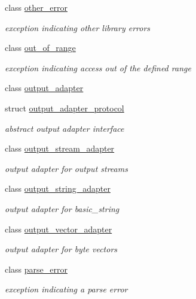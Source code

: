 \begin{DoxyCompactItemize}
class \hyperlink{classnlohmann_1_1detail_1_1other__error}{other\+\_\+error}
\begin{DoxyCompactList}\small\item\em exception indicating other library errors \end{DoxyCompactList}\item 
class \hyperlink{classnlohmann_1_1detail_1_1out__of__range}{out\+\_\+of\+\_\+range}
\begin{DoxyCompactList}\small\item\em exception indicating access out of the defined range \end{DoxyCompactList}\item 
class \hyperlink{classnlohmann_1_1detail_1_1output__adapter}{output\+\_\+adapter}
\item 
struct \hyperlink{structnlohmann_1_1detail_1_1output__adapter__protocol}{output\+\_\+adapter\+\_\+protocol}
\begin{DoxyCompactList}\small\item\em abstract output adapter interface \end{DoxyCompactList}\item 
class \hyperlink{classnlohmann_1_1detail_1_1output__stream__adapter}{output\+\_\+stream\+\_\+adapter}
\begin{DoxyCompactList}\small\item\em output adapter for output streams \end{DoxyCompactList}\item 
class \hyperlink{classnlohmann_1_1detail_1_1output__string__adapter}{output\+\_\+string\+\_\+adapter}
\begin{DoxyCompactList}\small\item\em output adapter for basic\+\_\+string \end{DoxyCompactList}\item 
class \hyperlink{classnlohmann_1_1detail_1_1output__vector__adapter}{output\+\_\+vector\+\_\+adapter}
\begin{DoxyCompactList}\small\item\em output adapter for byte vectors \end{DoxyCompactList}\item 
class \hyperlink{classnlohmann_1_1detail_1_1parse__error}{parse\+\_\+error}
\begin{DoxyCompactList}\small\item\em exception indicating a parse error \end{DoxyCompactList}\item 

\end{DoxyCompactItemize}
